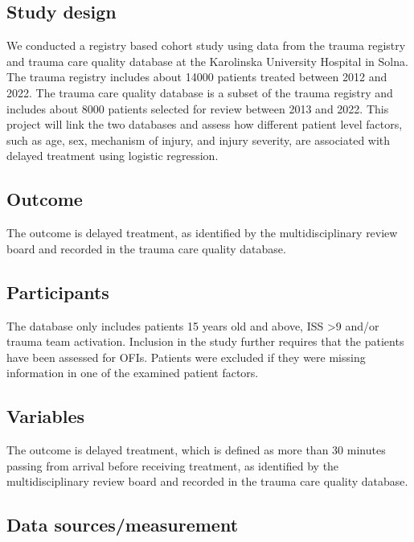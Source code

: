 \documentclass[
]{article}
\begin{document}
\hypertarget{study-design}{%
\subsection{Study design}\label{study-design}}

We conducted a registry based cohort study using data from the trauma
registry and trauma care quality database at the Karolinska University
Hospital in Solna. The trauma registry includes about 14000 patients
treated between 2012 and 2022. The trauma care quality database is a
subset of the trauma registry and includes about 8000 patients selected
for review between 2013 and 2022. This project will link the two
databases and assess how different patient level factors, such as age,
sex, mechanism of injury, and injury severity, are associated with
delayed treatment using logistic regression.

\hypertarget{outcome}{%
\subsection{Outcome}\label{outcome}}

The outcome is delayed treatment, as identified by the multidisciplinary
review board and recorded in the trauma care quality database.

\hypertarget{participants}{%
\subsection{Participants}\label{participants}}

The database only includes patients 15 years old and above, ISS
\textgreater9 and/or trauma team activation. Inclusion in the study
further requires that the patients have been assessed for OFIs. Patients
were excluded if they were missing information in one of the examined
patient factors.

\hypertarget{variables}{%
\subsection{Variables}\label{variables}}

The outcome is delayed treatment, which is defined as more than 30
minutes passing from arrival before receiving treatment, as identified
by the multidisciplinary review board and recorded in the trauma care
quality database.

\hypertarget{data-sourcesmeasurement}{%
\subsection{Data sources/measurement}\label{data-sourcesmeasurement}}
\end{document}
